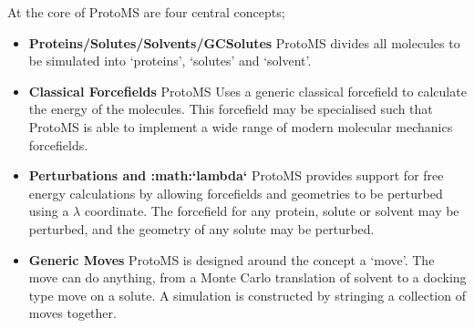 \documentclass[letterpaper,10pt,english]{sphinxmanual}
\begin{document}
At the core of ProtoMS are four central concepts;
\begin{itemize}
\item {} 
\textbf{Proteins/Solutes/Solvents/GCSolutes} ProtoMS divides all molecules to be simulated into ‘proteins’, ‘solutes’ and ‘solvent’.

\item {} 
\textbf{Classical Forcefields} ProtoMS Uses a generic classical forcefield to calculate the energy of the molecules. This forcefield may be specialised such that ProtoMS is able to implement a wide range of modern molecular mechanics forcefields.

\item {} 
\textbf{Perturbations and :math:{}`lambda{}`} ProtoMS provides support for free energy calculations by allowing forcefields and geometries to be perturbed using a \(\lambda\) coordinate. The forcefield for any protein, solute or solvent may be perturbed, and the geometry of any solute may be perturbed.

\item {} 
\textbf{Generic Moves} ProtoMS is designed around the concept a ‘move’. The move can do anything, from a Monte Carlo translation of solvent to a docking type move on a solute. A simulation is constructed by stringing a collection of moves together.

\end{itemize}
\end{document}
